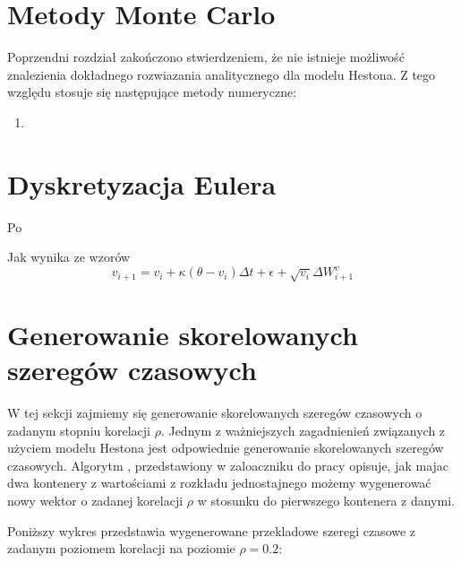 \documentclass{pracamgr}
\begin{document}


\section{Metody Monte Carlo}

Poprzendni rozdział zakończono stwierdzeniem, że nie istnieje możliwość znalezienia dokładnego rozwiazania analitycznego
dla modelu Hestona. Z tego względu stosuje się następujące metody numeryczne:
\begin{enumerate}
\item 
\end{enumerate}

\section{Dyskretyzacja Eulera}

Po

 Jak wynika ze wzorów  
\begin{equation}\label{h:euler}
v_{i+1}  = v_i + \kappa (\theta - v_i) \Delta t + \epsilon +  \sqrt{v_i} \Delta W^{v}_{i+1}
\end{equation}
  
\section{Generowanie skorelowanych szeregów czasowych}
W tej sekcji zajmiemy się generowanie skorelowanych szeregów czasowych o zadanym stopniu korelacji $\rho$.
Jednym z ważniejszych zagadnienień związanych z użyciem modelu Hestona jest odpowiednie generowanie skorelowanych szeregów czasowych. Algorytm , przedstawiony w zaloaczniku do pracy opisuje, jak majac dwa kontenery z wartościami z rozkładu jednostajnego możemy wygenerować nowy wektor o zadanej korelacji $\rho$ w stosunku do pierwszego kontenera z danymi. 

Poniższy wykres przedstawia wygenerowane przekladowe szeregi czasowe z zadanym poziomem korelacji na poziomie $\rho = 0.2$:
\end{document}
